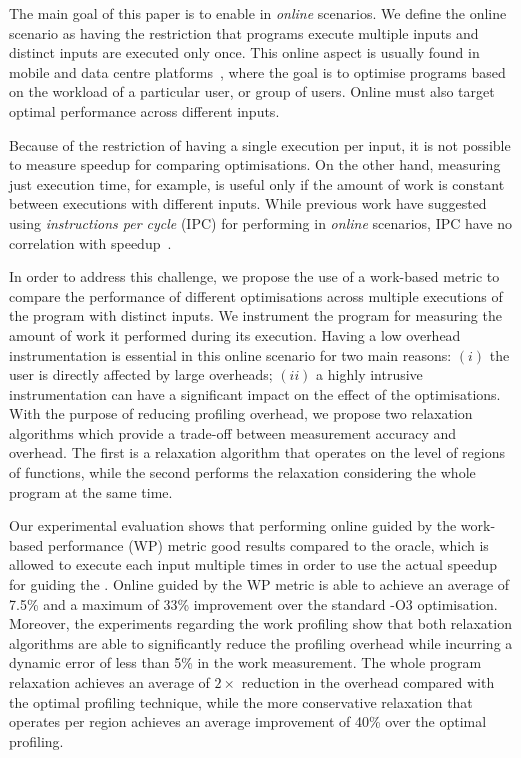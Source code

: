 The main goal of this paper is to enable {\itercomp} in \textit{online} scenarios.
We define the online scenario as having the restriction that programs execute multiple inputs and distinct inputs are executed only once.
This online aspect is usually found in mobile and data centre platforms~\citep{chen12b,fang15,mpeis16}, where the goal is to optimise programs based on the workload of a particular user, or group of users.
Online {\itercomp} must also target optimal performance across different inputs.

Because of the restriction of having a single execution per input, it is not possible to measure speedup for comparing optimisations.
On the other hand, measuring just execution time, for example, is useful only if the amount of work is constant between executions with different inputs.
While previous work have suggested using \textit{instructions per cycle} (IPC) for performing {\itercomp} in \textit{online} scenarios, IPC have no correlation with speedup~\citep{fursin07}.

In order to address this challenge, we propose the use of a work-based metric to compare the performance of different optimisations across multiple executions of the program with distinct inputs.
We instrument the program for measuring the amount of work it performed during its execution.
Having a low overhead instrumentation is essential in this online scenario for two main reasons:
$(i)$ the user is directly affected by large overheads;
$(ii)$ a highly intrusive instrumentation can have a significant impact on the effect of the optimisations.
With the purpose of reducing profiling overhead, we propose two relaxation algorithms which provide a trade-off between measurement accuracy and overhead.
The first is a relaxation algorithm that operates on the level of regions of functions, while the second performs the relaxation considering the whole program at the same time.

Our experimental evaluation shows that performing online {\itercomp} guided by the work-based performance (WP) metric good results compared to the oracle, which is allowed to execute each input multiple times in order to use the actual speedup for guiding the {\itercomp}.
Online {\itercomp} guided by the WP metric is able to achieve an average of 7.5\% and a maximum of 33\% improvement over the standard {\flagstype -O3} optimisation.
Moreover, the experiments regarding the work profiling show that both relaxation algorithms are able to significantly reduce the profiling overhead while incurring a dynamic error of less than 5\% in the work measurement.
The whole program relaxation achieves an average of $2\times$ reduction in the overhead compared with the optimal profiling technique, while the more conservative relaxation that operates per region achieves an average improvement of 40\% over the optimal profiling.

